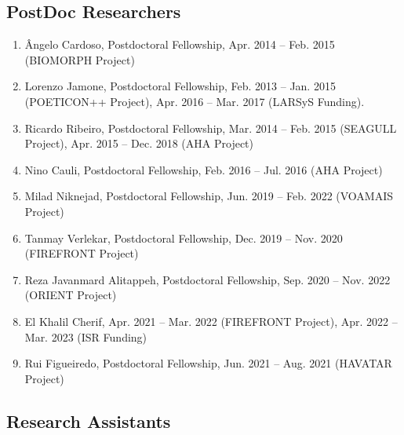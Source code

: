 \documentclass[
]{article}
\begin{document}
\subsection{PostDoc Researchers}\label{postdoc-researchers}

\begin{enumerate}
\def\labelenumi{\arabic{enumi}.}
\item
  Ângelo Cardoso, Postdoctoral Fellowship, Apr. 2014 -- Feb. 2015
  (BIOMORPH Project)
\item
  Lorenzo Jamone, Postdoctoral Fellowship, Feb. 2013 -- Jan. 2015
  (POETICON++ Project), Apr. 2016 -- Mar. 2017 (LARSyS Funding).
\item
  Ricardo Ribeiro, Postdoctoral Fellowship, Mar. 2014 -- Feb. 2015
  (SEAGULL Project), Apr. 2015 -- Dec. 2018 (AHA Project)
\item
  Nino Cauli, Postdoctoral Fellowship, Feb. 2016 -- Jul. 2016 (AHA
  Project)
\item
  Milad Niknejad, Postdoctoral Fellowship, Jun. 2019 -- Feb. 2022
  (VOAMAIS Project)
\item
  Tanmay Verlekar, Postdoctoral Fellowship, Dec. 2019 -- Nov. 2020
  (FIREFRONT Project)
\item
  Reza Javanmard Alitappeh, Postdoctoral Fellowship, Sep. 2020 -- Nov.
  2022 (ORIENT Project)
\item
  El Khalil Cherif, Apr. 2021 -- Mar. 2022 (FIREFRONT Project), Apr.
  2022 -- Mar. 2023 (ISR Funding)
\item
  Rui Figueiredo, Postdoctoral Fellowship, Jun. 2021 -- Aug. 2021
  (HAVATAR Project)
\end{enumerate}

\subsection{Research Assistants}\label{research-assistants}
\end{document}
